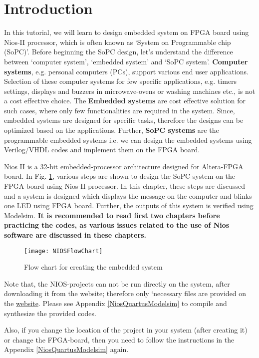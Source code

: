 \section{Introduction}
In this tutorial, we will learn to design embedded system on FPGA board using Nios-II processor, which is often known as `System on Programmable chip (SoPC)'. Before beginning the SoPC design, let's understand the difference between `computer system', `embedded system' and `SoPC system'. \textbf{Computer systems}, e.g. personal computers (PCs), support various end user applications. Selection of these computer systems for few specific applications, e.g. timers settings, displays and buzzers in microwave-ovens or washing machines etc.,  is not a cost effective choice. The \textbf{Embedded systems} are cost effective solution for such cases, where only few functionalities are required in the system.  Since, embedded systems are designed for specific tasks, therefore the designs can be optimized based on the applications. Further, \textbf{SoPC systems} are the programmable embedded systems i.e. we can design the embedded systems using Verilog/VHDL codes and implement them on the FPGA board.

Nios II is a 32-bit embedded-processor architecture designed for Altera-FPGA board. In Fig. \ref{fig:NiosFlowChart}, various steps are shown to design the SoPC system on the FPGA board using Nios-II processor. In this chapter, these steps are discussed and a system is designed which displays the message on the computer and blinks one LED using FPGA board. Further, the outputs of this system is verified using Modelsim.  \textbf{It is recommended to read first two chapters before practicing the codes, as various issues related to the use of Nios software are discussed in these chapters.}
\begin{figure}[!h]
	\centering
	\texttt{[image: NIOSFlowChart]}
	\caption{Flow chart for creating the embedded system}
	\label{fig:NiosFlowChart}
\end{figure}

\begin{noNumBox}
Note that, the NIOS-projects can not be run directly on the system, after downloading it from the website; therefore only `necessary files are provided on the \href{http://pythondsp.readthedocs.io/en/latest/pythondsp/toc.html}{website}. Please see Appendix \ref{NiosQuartusModelsim} to compile and synthesize the provided codes.
\end{noNumBox}

\begin{noNumBox}
Also, if you change the location of the project in your system (after creating it) or change the FPGA-board, then you need to follow the instructions in the Appendix \ref{NiosQuartusModelsim} again.  
\end{noNumBox}

